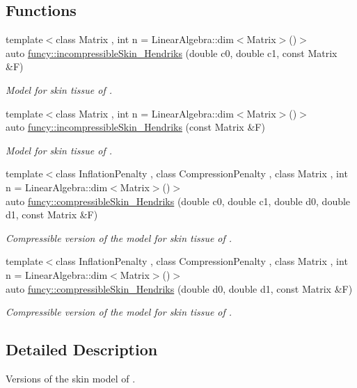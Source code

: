 \subsection*{Functions}
\begin{DoxyCompactItemize}
\item 
{\footnotesize template$<$class Matrix , int n = Linear\-Algebra\-::dim$<$\-Matrix$>$()$>$ }\\auto \hyperlink{group__Biomechanics_ga4d27dc5aefb556c1fa7ef71e6549de96}{funcy\-::incompressible\-Skin\-\_\-\-Hendriks} (double c0, double c1, const Matrix \&F)
\begin{DoxyCompactList}\small\item\em Model for skin tissue of \cite{Hendriks2005}. \end{DoxyCompactList}\item 
{\footnotesize template$<$class Matrix , int n = Linear\-Algebra\-::dim$<$\-Matrix$>$()$>$ }\\auto \hyperlink{group__Biomechanics_ga2e1b8683d6c9cb90d2b8425f1bb1247b}{funcy\-::incompressible\-Skin\-\_\-\-Hendriks} (const Matrix \&F)
\begin{DoxyCompactList}\small\item\em Model for skin tissue of \cite{Hendriks2005}. \end{DoxyCompactList}\item 
{\footnotesize template$<$class Inflation\-Penalty , class Compression\-Penalty , class Matrix , int n = Linear\-Algebra\-::dim$<$\-Matrix$>$()$>$ }\\auto \hyperlink{group__Biomechanics_gac0b05f2d4c1323387e305d07163ba5de}{funcy\-::compressible\-Skin\-\_\-\-Hendriks} (double c0, double c1, double d0, double d1, const Matrix \&F)
\begin{DoxyCompactList}\small\item\em Compressible version of the model for skin tissue of \cite{Hendriks2005}. \end{DoxyCompactList}\item 
{\footnotesize template$<$class Inflation\-Penalty , class Compression\-Penalty , class Matrix , int n = Linear\-Algebra\-::dim$<$\-Matrix$>$()$>$ }\\auto \hyperlink{group__Biomechanics_ga03684718dd8b87b1370fdf4d6351a066}{funcy\-::compressible\-Skin\-\_\-\-Hendriks} (double d0, double d1, const Matrix \&F)
\begin{DoxyCompactList}\small\item\em Compressible version of the model for skin tissue of \cite{Hendriks2005}. \end{DoxyCompactList}\end{DoxyCompactItemize}


\subsection{Detailed Description}
Versions of the skin model of \cite{Hendriks2005}. 